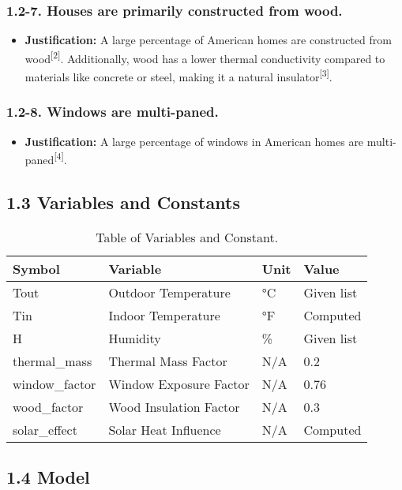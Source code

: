\documentclass{article}
\begin{document}
\subsubsection*{1.2-7. \textbf{Houses are primarily constructed from wood.}}
\begin{itemize}
    \item \textbf{Justification:} A large percentage of American homes are constructed from wood\textsuperscript{[2]}. Additionally, wood has a lower thermal conductivity compared to materials like concrete or steel, making it a natural insulator\textsuperscript{[3]}.
\end{itemize}
\subsubsection*{1.2-8. \textbf{\textbf{Windows are multi-paned. }}}
\begin{itemize}
    \item \textbf{Justification:} A large percentage of windows in American homes are multi-paned\textsuperscript{[4]}.
\end{itemize}
\subsection*{1.3 Variables and Constants}
\clearpage
\begin{table}
\centering

\begin{tabular}{| l | l | l | l |}
\hline
Symbol & Variable & Unit & Value \\
\hline
Tout & Outdoor Temperature & °C & Given list \\
\hline
Tin & Indoor Temperature & °F & Computed \\
\hline
H & Humidity & \% & Given list \\
\hline
thermal\_mass & Thermal Mass Factor & N/A & 0.2 \\
\hline
window\_factor & Window Exposure Factor & N/A & 0.76 \\
\hline
wood\_factor & Wood Insulation Factor & N/A & 0.3 \\
\hline
solar\_effect & Solar Heat Influence & N/A & Computed \\
\hline

\end{tabular}
\caption{Table of Variables and Constant.}
\label{tab:my_table}
\end{table}

\subsection*{1.4 Model}
\end{document}
